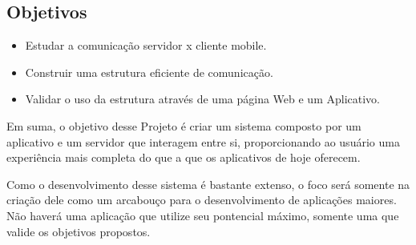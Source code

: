 \documentclass[a4paper,12pt]{article}
\begin{document}
\newpage
\subsection{Objetivos}

\begin{itemize}
    \item Estudar a comunicação servidor x cliente mobile.

    \item Construir uma estrutura eficiente de comunicação.

    \item Validar o uso da estrutura através de uma página Web e um Aplicativo.






\end{itemize}



Em suma, o objetivo desse Projeto é criar um sistema composto por um aplicativo e um servidor que interagem entre si, proporcionando ao usuário uma experiência mais completa do que a que os aplicativos de hoje oferecem.

Como o desenvolvimento desse sistema é bastante extenso, o foco será somente na criação dele como um arcabouço para o desenvolvimento de aplicações maiores. Não haverá uma aplicação que utilize seu pontencial máximo, somente uma que valide os objetivos propostos.


\end{document}
